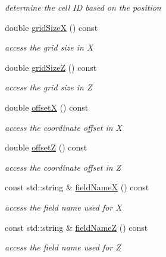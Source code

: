 \begin{DoxyCompactItemize}
\begin{DoxyCompactList}\small\item\em determine the cell ID based on the position \end{DoxyCompactList}\item 
double \hyperlink{class_d_d4hep_1_1_d_d_segmentation_1_1_cartesian_grid_x_z_afa2865ae620a199a6dc63a594fa03266}{grid\+SizeX} () const
\begin{DoxyCompactList}\small\item\em access the grid size in X \end{DoxyCompactList}\item 
double \hyperlink{class_d_d4hep_1_1_d_d_segmentation_1_1_cartesian_grid_x_z_a56d325349bfa6aedd3e9d17e29d415ee}{grid\+SizeZ} () const
\begin{DoxyCompactList}\small\item\em access the grid size in Z \end{DoxyCompactList}\item 
double \hyperlink{class_d_d4hep_1_1_d_d_segmentation_1_1_cartesian_grid_x_z_a5e1370da40ec8f75e1b205910c6e698c}{offsetX} () const
\begin{DoxyCompactList}\small\item\em access the coordinate offset in X \end{DoxyCompactList}\item 
double \hyperlink{class_d_d4hep_1_1_d_d_segmentation_1_1_cartesian_grid_x_z_a114a46c5328dfdf6bd4ed5d04bf8ec29}{offsetZ} () const
\begin{DoxyCompactList}\small\item\em access the coordinate offset in Z \end{DoxyCompactList}\item 
const std\+::string \& \hyperlink{class_d_d4hep_1_1_d_d_segmentation_1_1_cartesian_grid_x_z_abf89a7141c0409f067134166252c92b8}{field\+NameX} () const
\begin{DoxyCompactList}\small\item\em access the field name used for X \end{DoxyCompactList}\item 
const std\+::string \& \hyperlink{class_d_d4hep_1_1_d_d_segmentation_1_1_cartesian_grid_x_z_ac70bdf9b6eb9d473d3037bac9bf5711c}{field\+NameZ} () const
\begin{DoxyCompactList}\small\item\em access the field name used for Z \end{DoxyCompactList}\item 

\end{DoxyCompactItemize}
